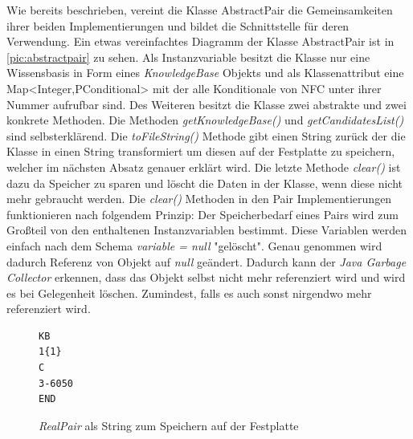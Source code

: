 \documentclass[12pt,a4paper]{article}
\begin{document}
Wie bereits beschrieben, vereint die Klasse AbstractPair die Gemeinsamkeiten ihrer beiden Implementierungen und bildet die Schnittstelle für deren Verwendung. Ein etwas vereinfachtes Diagramm der Klasse AbstractPair ist in \autoref{pic:abstractpair}  zu sehen. Als Instanzvariable besitzt die Klasse nur eine Wissensbasis in Form eines \textit{KnowledgeBase} Objekts und als Klassenattribut eine Map<Integer,PConditional> mit der alle Konditionale von NFC unter ihrer Nummer aufrufbar sind. Des Weiteren besitzt die Klasse zwei abstrakte und zwei konkrete Methoden. Die Methoden \textit{getKnowledgeBase()} und \textit{ getCandidatesList()} sind selbsterklärend. Die \textit{toFileString()} Methode gibt einen String zurück der die Klasse in einen String transformiert um diesen auf der Festplatte zu speichern, welcher im nächsten Absatz genauer erklärt wird. Die letzte Methode \textit{clear()} ist dazu da Speicher zu sparen und löscht die Daten in der Klasse, wenn diese nicht mehr gebraucht werden. Die \textit{clear()} Methoden in den Pair Implementierungen funktionieren nach folgendem Prinzip: Der Speicherbedarf eines Pairs wird zum Großteil von den enthaltenen Instanzvariablen bestimmt. Diese Variablen werden einfach nach dem Schema \textit{variable = null} "gelöscht". Genau genommen wird dadurch Referenz von Objekt auf \textit{null} geändert. Dadurch kann der \textit{Java Garbage Collector} erkennen, dass das Objekt selbst nicht mehr referenziert wird und wird es bei Gelegenheit löschen. Zumindest, falls es auch sonst nirgendwo mehr referenziert wird.

\begin{figure}
\begin{lstlisting}
KB
1{1}
C
3-6050
END
\end{lstlisting}
\caption{\textit{RealPair} als String zum Speichern auf der Festplatte}
\label{code:pair-text}
\end{figure} 
\end{document}
